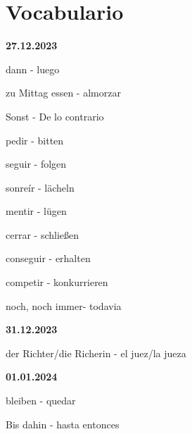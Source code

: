 \chapter{Vocabulario}
\begin{vocabulario}
    \item \textbf{27.12.2023}
    \item dann - luego
    \item zu Mittag essen - almorzar
    \item Sonst - De lo contrario
    \item pedir - bitten
    \item seguir - folgen
    \item sonre\'ir - lächeln 
    \item mentir - lügen
    \item cerrar - schließen
    \item conseguir - erhalten
    \item competir - konkurrieren
    \item noch, noch immer- todavia
\end{vocabulario}

\begin{vocabulario}
    \item \textbf{31.12.2023}
    \item der Richter/die Richerin - el juez/la jueza
\end{vocabulario}

\begin{vocabulario}
    \item \textbf{01.01.2024}
    \item bleiben - quedar
    \item Bis dahin - hasta entonces
\end{vocabulario}